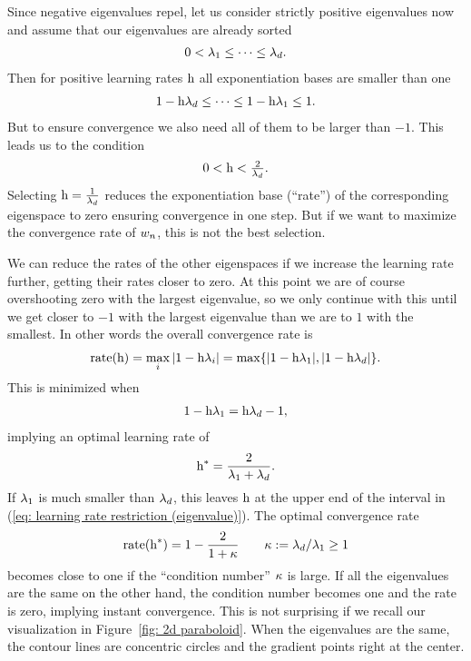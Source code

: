 Since negative eigenvalues repel, let us consider strictly positive eigenvalues
now and assume that our eigenvalues are already sorted
%
\begin{align}
	0 < \lambda_1 \le \dots \le \lambda_d.
\end{align}
%
Then for positive learning rates \(\text{h}\) all exponentiation bases are smaller
than one
%
\begin{align*}
	1-\text{h}\lambda_d \le \dots \le 1-\text{h}\lambda_1 \le 1.
\end{align*}
%
But to ensure convergence we also need all of them to be larger than \(-1\).
This leads us to the condition
\begin{align}\label{eq: learning rate restriction (eigenvalue)}
	0< \text{h} < \tfrac{2}{\lambda_d}.
\end{align}
%
Selecting \(\text{h} = \tfrac{1}{\lambda_d}\) reduces the exponentiation
base (``rate'') of the corresponding eigenspace to zero ensuring convergence in
one step. But if we want to maximize the convergence rate of \(w_n\),
this is not the best selection.

We can reduce the rates of the other eigenspaces if we increase the learning
rate further, getting their rates closer to zero. At this point we are of course
overshooting zero with the largest eigenvalue, so we only continue with this
until we get closer to \(-1\) with the largest eigenvalue than we are to \(1\)
with the smallest. In other words the overall convergence rate is
%
\begin{align*}
	\text{rate}(\text{h})=\max_{i} |1-\text{h}\lambda_i| = \max\{|1-\text{h}\lambda_1|, |1-\text{h}\lambda_d|\}.
\end{align*}
%
This is minimized when
%
\begin{align*}
	1-\text{h}\lambda_1 = \text{h}\lambda_d -1,
\end{align*}
%
implying an optimal learning rate of
%
\begin{align}\label{eq: optimal SGD lr eigenvalue representation}
	\text{h}^* = \frac{2}{\lambda_1 + \lambda_d}.
\end{align}
%
If \(\lambda_1\) is much smaller than \(\lambda_d\), this leaves \(\text{h}\)
at the upper end of the interval in (\ref{eq: learning rate restriction
(eigenvalue)}). The optimal convergence rate
%
\begin{align*}
	\text{rate}(\text{h}^*)
	= 1 - \frac{2}{1+\kappa}
	\qquad \kappa:=\lambda_d/\lambda_1 \ge 1
\end{align*}
%
becomes close to one if the ``condition number'' \(\kappa\) is large.
If all the eigenvalues are the same on the other hand, the condition number
becomes one and the rate is zero, implying instant convergence. This is not
surprising if we recall our visualization in Figure~\ref{fig: 2d paraboloid}.
When the eigenvalues are the same, the contour lines are concentric circles and
the gradient points right at the center.


